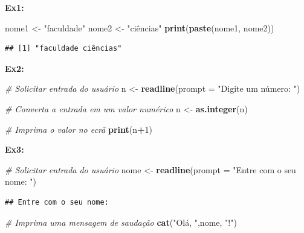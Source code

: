 \documentclass[
]{book}
\newenvironment{Shaded}{\begin{snugshade}}{\end{snugshade}}
\newcommand{\AttributeTok}[1]{\textcolor[rgb]{0.13,0.29,0.53}{#1}}
\newcommand{\CommentTok}[1]{\textcolor[rgb]{0.56,0.35,0.01}{\textit{#1}}}
\newcommand{\DecValTok}[1]{\textcolor[rgb]{0.00,0.00,0.81}{#1}}
\newcommand{\FunctionTok}[1]{\textcolor[rgb]{0.13,0.29,0.53}{\textbf{#1}}}
\newcommand{\NormalTok}[1]{#1}
\newcommand{\OtherTok}[1]{\textcolor[rgb]{0.56,0.35,0.01}{#1}}
\newcommand{\SpecialCharTok}[1]{\textcolor[rgb]{0.81,0.36,0.00}{\textbf{#1}}}
\newcommand{\StringTok}[1]{\textcolor[rgb]{0.31,0.60,0.02}{#1}}
\theoremstyle{definition}
\theoremstyle{definition}
\theoremstyle{definition}
\theoremstyle{definition}
\theoremstyle{remark}
\begin{document}
\textbf{Ex1:}

\begin{Shaded}
\begin{Highlighting}[]
\NormalTok{nome1 }\OtherTok{\textless{}{-}} \StringTok{"faculdade"}
\NormalTok{nome2 }\OtherTok{\textless{}{-}} \StringTok{"ciências"}
\FunctionTok{print}\NormalTok{(}\FunctionTok{paste}\NormalTok{(nome1, nome2))}
\end{Highlighting}
\end{Shaded}

\begin{verbatim}
## [1] "faculdade ciências"
\end{verbatim}

\textbf{Ex2:}

\begin{Shaded}
\begin{Highlighting}[]
\CommentTok{\# Solicitar entrada do usuário}
\NormalTok{n }\OtherTok{\textless{}{-}} \FunctionTok{readline}\NormalTok{(}\AttributeTok{prompt =} \StringTok{"Digite um número: "}\NormalTok{)}

\CommentTok{\# Converta a entrada em um valor numérico}
\NormalTok{n }\OtherTok{\textless{}{-}} \FunctionTok{as.integer}\NormalTok{(n)}

\CommentTok{\# Imprima o valor no ecrã}
\FunctionTok{print}\NormalTok{(n}\SpecialCharTok{+}\DecValTok{1}\NormalTok{)}
\end{Highlighting}
\end{Shaded}

\textbf{Ex3:}

\begin{Shaded}
\begin{Highlighting}[]
\CommentTok{\# Solicitar entrada do usuário}
\NormalTok{nome }\OtherTok{\textless{}{-}} \FunctionTok{readline}\NormalTok{(}\AttributeTok{prompt =} \StringTok{"Entre com o seu nome: "}\NormalTok{)}
\end{Highlighting}
\end{Shaded}

\begin{verbatim}
## Entre com o seu nome:
\end{verbatim}

\begin{Shaded}
\begin{Highlighting}[]
\CommentTok{\# Imprima uma mensagem de saudação}
\FunctionTok{cat}\NormalTok{(}\StringTok{"Olá, "}\NormalTok{,nome, }\StringTok{"!"}\NormalTok{)}
\end{Highlighting}
\end{Shaded}
\end{document}
